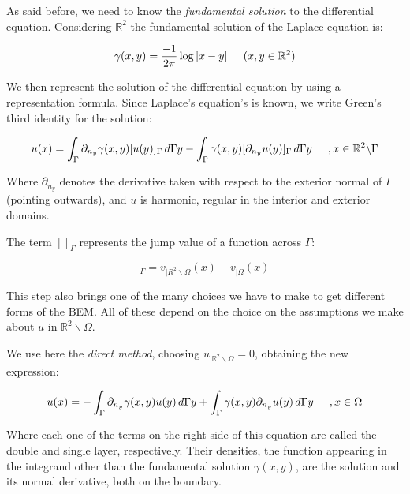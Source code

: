 As said before, we need to know the \textit{fundamental solution} to the differential equation. Considering $\mathbb{R}^{2}$ the fundamental solution of the Laplace equation is:

\begin{equation}
    \gamma (x,y) = \frac{-1}{2\pi} \log |x-y| \hspace{0.2in} (x,y \in \mathbb{R}^{2})
\end{equation}


We then represent the solution of the differential equation by using a representation formula. Since Laplace's equation's is known, we write Green's third identity for the solution:

\begin{equation}\label{eq:green_3id}
    u(x) = \int_{\Gamma} \partial_{n_{y}} \gamma (x,y) [u(y)]_{\Gamma} \,d\Gamma y - \int_{\Gamma} \gamma(x,y) [\partial_{n_{y}}u(y)]_{\Gamma} \,d\Gamma y \hspace{0.2in}, x \in \mathbb{R}^{2} \backslash \Gamma
\end{equation}

Where $\partial_{n_{y}}$ denotes the derivative taken with respect to the exterior normal of $\Gamma$(pointing outwards), and $u$ is harmonic, regular in the interior and exterior domains.

The term $[]_{\Gamma}$ represents the jump value of a function across $\Gamma$:

\begin{equation}
    [v(x)]_{\Gamma} = v_{|R^{2} \backslash \Omega}(x) - v_{|\overline{\Omega}}(x)
\end{equation}

This step also brings one of the many choices we have to make to get different forms of the BEM. All of these depend on the choice on the assumptions we make about $u$ in $\mathbb{R}^{2} \backslash \Omega$.

We use here the \textit{direct method}, choosing $u_{|\mathbb{R}^{2}\backslash \Omega} = 0 $, obtaining the new expression:

\begin{equation}\label{eq:solinit_bem}
    u(x) = - \int_{\Gamma} \partial_{n_{y}} \gamma(x,y) u(y) \,d\Gamma y +  \int_{\Gamma} \gamma(x,y)\partial_{n_{y}} u(y) \,d\Gamma y \hspace{0.2in}, x \in \Omega
\end{equation}

Where each one of the terms on the right side of this equation are called the double and single layer, respectively. Their densities, the function appearing in the integrand other than the fundamental solution $\gamma(x,y)$, are the solution and its normal derivative, both on the boundary.

